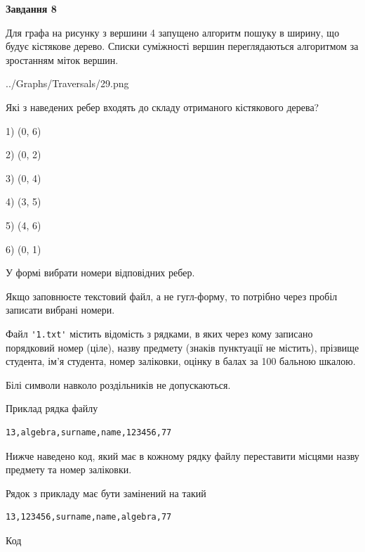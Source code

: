 \documentclass[12pt, ukrainian]{article}
\def\code#1{\Verb!#1!}
\begin{document}
{\begin {large}
{\begin {center}\textbf{Завдання 8}\end {center}}\par
Для графа на рисунку з вершини 4 запущено алгоритм пошуку в ширину, що будує кістякове дерево. Списки суміжності вершин переглядаються алгоритмом за зростанням міток вершин.\par
\begin{center}
	{../Graphs/Traversals/29.png}
\end{center}
\par Які з наведених ребер входять до складу отриманого кістякового дерева?\par
1) (0, 6)\par
2) (0, 2)\par
3) (0, 4)\par
4) (3, 5)\par
5) (4, 6)\par
6) (0, 1)\par
{\vskip 15pt} У формі вибрати номери відповідних ребер.


Якщо заповнюєте текстовий файл, а не гугл-форму, то потрібно через пробіл записа\-ти вибрані номери.\par
\newpage


Файл \code{'1.txt'} містить відомість з рядками, в яких через кому записано поряд\-ковий номер (ціле), назву предмету (знаків пунктуації не містить), прізвище студента, ім'я студента, номер заліковки, оцінку в балах за 100 бальною шкалою.

Білі символи навколо роздільників не допускаються.

Приклад рядка файлу



\begin{verbatim}
13,algebra,surname,name,123456,77
\end{verbatim}


Нижче наведено код, який має в кожному рядку файлу переставити місцями назву предмету та номер заліковки.

Рядок з прикладу має бути замінений на такий



\begin{verbatim}
13,123456,surname,name,algebra,77
\end{verbatim}




Код




\end{large}}
\end{document}
